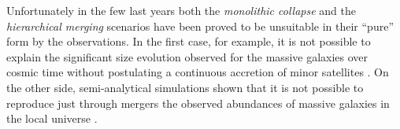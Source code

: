 	Unfortunately in the few last years both the \textit{monolithic collapse} and the \textit{hierarchical merging} scenarios have 
	been proved to be unsuitable in their ``pure'' form by the observations.
	In the first case, for example, it is not possible to explain the significant size evolution observed for the massive galaxies over 
	cosmic time without postulating a continuous accretion of minor satellites \citep{Daddi05, Trujillo06}. 
	On the other side, semi-analytical simulations shown that it is not possible to reproduce just through mergers the observed 
	abundances of massive galaxies 	in the local universe \citep{Conselice07}.


